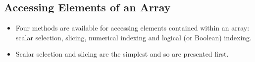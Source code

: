 \documentclass[Pydata.tex]{subfiles}
\begin{document}
\subsection{Accessing Elements of an Array }



\begin{itemize}
\item Four methods are available for accessing elements contained within an array: scalar selection, slicing,
numerical indexing and logical (or Boolean) indexing. 
\item Scalar selection and slicing are the simplest and so
are presented first. 
\end{itemize}
\newpage
\end{document}
